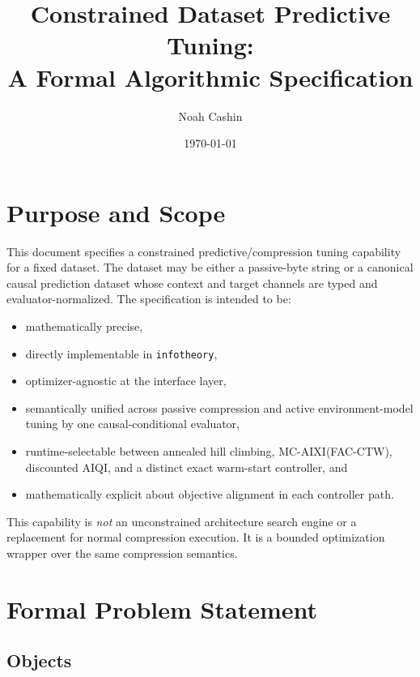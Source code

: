 \documentclass[11pt]{article}
\title{Constrained Dataset Predictive Tuning:\\A Formal Algorithmic Specification}
\author{Noah Cashin}
\date{\today}
\begin{document}
\maketitle

\section{Purpose and Scope}\label{sec:purpose-scope}

This document specifies a constrained predictive/compression tuning capability
for a fixed dataset. The dataset may be either a passive-byte string or a
canonical causal prediction dataset whose context and target channels are typed
and evaluator-normalized.
The specification is intended to be:
\begin{itemize}
    \item mathematically precise,
    \item directly implementable in \texttt{infotheory},
    \item optimizer-agnostic at the interface layer,
    \item semantically unified across passive compression and active
    environment-model tuning by one causal-conditional evaluator,
    \item runtime-selectable between annealed hill climbing,
    MC-AIXI(FAC-CTW), discounted AIQI, and a distinct exact
    warm-start controller, and
    \item mathematically explicit about objective alignment in each controller path.
\end{itemize}

This capability is \emph{not} an unconstrained architecture search engine or a
replacement for normal compression execution. It is a bounded optimization
wrapper over the same compression semantics.

\section{Formal Problem Statement}\label{sec:formal-problem}

\subsection{Objects}
\end{document}
